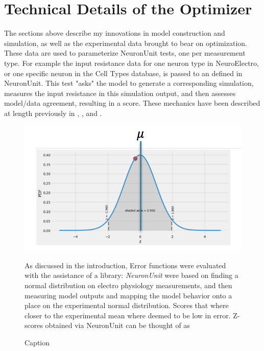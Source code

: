 \section{Technical Details of the Optimizer}
The sections above describe my innovations in model construction and simulation, as well as the experimental data brought to bear on optimization. These data are used to parameterize NeuronUnit tests, one per measurement type.
For example the input resistance data for one neuron type in NeuroElectro, or one specific neuron in the Cell Types database, is passed to an  defined in NeuronUnit.
This test "asks" the model to generate a corresponding simulation, measures the input resistance in this simulation output, and then assesses model/data agreement, resulting in a score.
These mechanics have been described at length previously in \cite{omar2014collaborative}, \cite{gerkin_neuronunit}, and \cite{birgiolas2019towards}.

\begin{figure}
\begin{center}
	\includegraphics{figures/normal_distribution}
    \caption{As discussed in the introduction, Error functions were evaluated with the assistance of a library: \emph{NeuronUnit} 
    were based on finding a normal distribution on electro physiology measurements, 
    and then measuring model outputs and mapping the model behavior onto
     a place on the experimental normal distribution. Scores that where closer to the
      experimental mean where deemed to be low in error.
	Z-scores obtained via NeuronUnit can be thought of as  }
	
\caption{Caption}
\end{center}
	
\end{figure}

